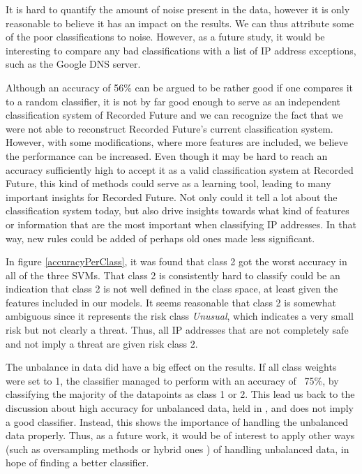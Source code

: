 It is hard to quantify the amount of noise present in the data, however it is only reasonable to believe it has an impact on the results. We can thus attribute some of the poor classifications to noise. However, as a future study, it would be interesting to compare any bad classifications with a list of IP address exceptions, such as the Google DNS server. 

Although an accuracy of 56\% can be argued to be rather good if one compares it to a random classifier, it is not by far good enough to serve as an independent classification system of Recorded Future and we can recognize the fact that we were not able to reconstruct Recorded Future's current classification system. However, with some modifications, where more features are included, we believe the performance can be increased. Even though it may be hard to reach an accuracy sufficiently high to accept it as a valid classification system at Recorded Future, this kind of methods could serve as a learning tool, leading to many important insights for Recorded Future. Not only could it tell a lot about the classification system today, but also drive insights towards what kind of features or information that are the most important when classifying IP addresses. In that way, new rules could be added of perhaps old ones made less significant. 

In figure \ref{accuracyPerClass}, it was found that class 2 got the worst accuracy in all of the three SVMs. That class 2 is consistently hard to classify could be an indication that class 2 is not well defined in the class space, at least given the features included in our models. It seems reasonable that class 2 is somewhat ambiguous since it represents the risk class \textit{Unusual}, which indicates a very small risk but not clearly a threat. Thus, all IP addresses that are not completely safe and not imply a threat are given risk class 2.

The unbalance in data did have a big effect on the results. If all class weights were set to 1, the classifier managed to perform with an accuracy of ~75\%, by classifying the majority of the datapoints as class 1 or 2. This lead us back to the discussion about high accuracy for unbalanced data, held in , and does not imply a good classifier. Instead, this shows the importance of handling the unbalanced data properly. Thus, as a future work, it would be of interest to apply other ways (such as oversampling methods or hybrid ones \citep{wang2014}) of handling unbalanced data, in hope of finding a better classifier. 

